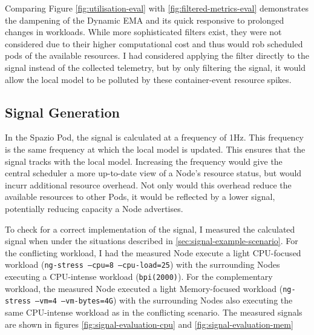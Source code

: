 Comparing Figure \ref{fig:utilisation-eval} with \ref{fig:filtered-metrics-eval}
demonstrates the dampening of the Dynamic EMA and its quick responsive to
prolonged changes in workloads. While more sophisticated filters exist, they
were not considered due to their higher computational cost and thus would rob
scheduled pods of the available resources. I had considered applying the filter
directly to the signal instead of the collected telemetry, but by only filtering
the signal, it would allow the local model to be polluted by these
container-event resource spikes.

\subsection{Signal Generation}
In the Spazio Pod, the signal is calculated at a frequency of 1Hz. This
frequency is the same frequency at which the local model is updated. This
ensures that the signal tracks with the local model. Increasing the frequency
would give the central scheduler a more up-to-date view of a Node's resource
status, but would incurr additional resource overhead. Not only would this
overhead reduce the available resources to other Pods, it would be reflected by
a lower signal, potentially reducing capacity a Node advertises.

To check for a correct implementation of the signal, I measured the calculated
signal when under the situations described in
\ref{sec:signal-example-scenario}. For the conflicting workload, I had the
measured Node execute a light CPU-focused workload (\texttt{ng-stress --cpu=8
--cpu-load=25}) with the surrounding Nodes executing a CPU-intense workload
(\texttt{bpi(2000)}). For the complementary workload, the measured Node executed a
light Memory-focused workload (\texttt{ng-stress --vm=4 --vm-bytes=4G}) with the
surrounding Nodes also executing the same CPU-intense workload as in the
conflicting scenario. The measured signals are shown in figures
\ref{fig:signal-evaluation-cpu} and \ref{fig:signal-evaluation-mem}

